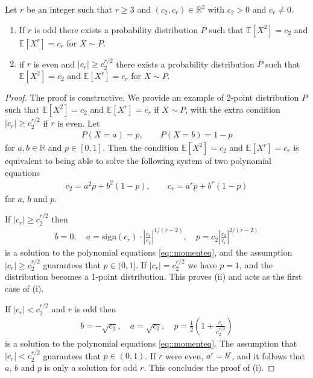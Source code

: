 \documentclass{biometrika}
\begin{document}
\begin{lemma} \label{lem::rawmomentsexample}
    Let $r$ be an integer such that $r \geq 3$ and $(c_2, c_r) \in \mathbb{R}^2$ with $c_2 > 0$ and $c_r \neq 0$. 
    \begin{enumerate}[label = (\roman*),leftmargin=*, widest=iii]
        \item If $r$ is odd there exists a probability distribution $P$ such that $\mathbb{E}[X^2] = c_2$ and $\mathbb{E}[X^r] = c_r$  for $X \sim P$. 
        \item if $r$ is even and $|c_r| \geq c_2^{r/2}$ there exists a probability distribution $P$ such that $\mathbb{E}[X^2] = c_2$ and $\mathbb{E}[X^r] = c_r$  for $X \sim P$.
    \end{enumerate}
\end{lemma}
\begin{proof}
    The proof is constructive. 
    We provide an example of 2-point distribution $P$ such that $\mathbb{E}[X^2] = c_2$ and $\mathbb{E}[X^r] = c_r$ if $X \sim P$, with the extra condition $|c_r| \geq c_2^{r/2}$ if $r$ is even. Let
    \begin{align*}
        P( X = a) = p, \qquad P(X = b) = 1-p
    \end{align*}
    for $a,b \in \mathbb{R}$ and $p \in [0,1]$. Then the condition $\mathbb{E}[X^2] = c_2$ and $\mathbb{E}[X^r] = c_r$ is equivalent to being able to solve the following system of two polynomial equations
    \begin{align} \label{eq::momenteq}
        c_2 = a^2 p + b^2 (1-p), \qquad c_r = a^r p + b^r (1-p)
    \end{align}
    for $a$, $b$ and $p$. 

    If $|c_r| \geq c_2^{r/2}$ then 
    \begin{align*}
        b = 0, \quad a = \mathrm{sign}(c_r) \cdot \left| \frac{c_r}{c_2} \right|^{1/(r-2)}, \quad p = c_2 \left| \frac{c_2}{c_r} \right|^{2/(r-2)}
    \end{align*}
    is a solution to the polynomial equations \eqref{eq::momenteq}, and the assumption $|c_r| \geq c_2^{r/2}$ guarantees that $p \in (0,1]$. If $|c_r| = c_2^{r/2}$ we have $p = 1$, and the distribution becomes a 1-point distribution. This proves (ii) and acts as the first case of (i). 

    If $|c_r| < c_2^{r/2}$ and $r$ is odd then
    \begin{align*}
        b = - \sqrt{c_2}, \quad a = \sqrt{c_2}, \quad p = \frac{1}{2} \left( 1+ \frac{c_r}{c_2^{r/2}} \right)
    \end{align*}
    is a solution to the polynomial equations \eqref{eq::momenteq}. The assumption that $|c_r| < c_2^{r/2}$ guarantees that $p \in (0,1)$. If $r$ were even, $a^r = b^r$, and it follows that $a$, $b$ and $p$ is only a solution for odd $r$. 
    This concludes the proof of (i). 
\end{proof}
\end{document}

